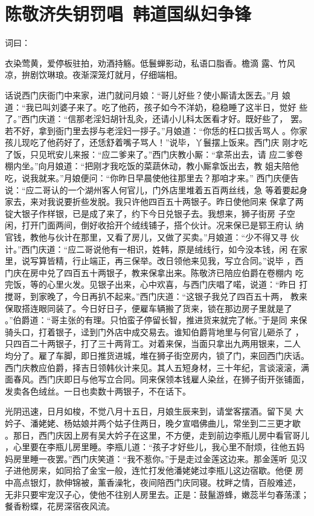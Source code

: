 \chapter{陈敬济失钥罚唱~韩道国纵妇争锋}

词曰：

衣染莺黄，爱停板驻拍，劝酒持觞。低鬟蝉影动，私语口脂香。檐滴
露、竹风凉，拚剧饮琳琅。夜渐深笼灯就月，仔细端相。

话说西门庆衙门中来家，进门就问月娘：“哥儿好些？使小厮请太医去。”月
娘道：“我已叫刘婆子来了。吃了他药，孩子如今不洋奶，稳稳睡了这半日，觉好
些了。”西门庆道：“信那老淫妇胡针乱灸，还请小儿科太医看才好。既好些了，
罢。若不好，拿到衙门里去拶与老淫妇一拶子。”月娘道：“你恁的枉口拔舌骂人
。你家孩儿现吃了他药好了，还恁舒着嘴子骂人！”说毕，丫鬟摆上饭来。西门庆
刚才吃了饭，只见玳安儿来报：“应二爹来了。”西门庆教小厮：“拿茶出去，请
应二爹卷棚内坐。”向月娘道：“把刚才我吃饭的菜蔬休动，教小厮拿饭出去，教
姐夫陪他吃，说我就来。”月娘便问：“你昨日早晨使他往那里去？那咱才来。”
西门庆便告说：“应二哥认的一个湖州客人何官儿，门外店里堆着五百两丝线，急
等着要起身家去，来对我说要折些发脱。我只许他四百五十两银子。昨日使他同来
保拿了两锭大银子作样银，已是成了来了，约下今日兑银子去。我想来，狮子街房
子空闲，打开门面两间，倒好收拾开个绒线铺子，搭个伙计。况来保已是郓王府认
纳官钱，教他与伙计在那里，又看了房儿，又做了买卖。”月娘道：“少不得又寻
伙计。”西门庆道：“应二哥说他有一相识，姓韩，原是绒线行，如今没本钱，闲
在家里，说写算皆精，行止端正，再三保举。改日领他来见我，写立合同。”说毕
，西门庆在房中兑了四百五十两银子，教来保拿出来。陈敬济已陪应伯爵在卷棚内
吃完饭，等的心里火发。见银子出来，心中欢喜，与西门庆唱了喏，说道：“昨日
打搅哥，到家晚了，今日再扒不起来。”西门庆道：“这银子我兑了四百五十两，
教来保取搭连眼同装了。今日好日子，便雇车辆搬了货来，锁在那边房子里就是了
。”伯爵道：“哥主张的有理。只怕蛮子停留长智，推进货来就完了帐。”于是同
来保骑头口，打着银子，迳到门外店中成交易去。谁知伯爵背地里与何官儿砸杀了
，只四百二十两银子，打了三十两背工。对着来保，当面只拿出九两用银来，二人
均分了。雇了车脚，即日推货进城，堆在狮子街空房内，锁了门，来回西门庆话。
西门庆教应伯爵，择吉日领韩伙计来见。其人五短身材，三十年纪，言谈滚滚，满
面春风。西门庆即日与他写立合同。同来保领本钱雇人染丝，在狮子街开张铺面，
发卖各色绒丝。一日也卖数十两银子，不在话下。

光阴迅速，日月如梭，不觉八月十五日，月娘生辰来到，请堂客摆酒。留下吴
大妗子、潘姥姥、杨姑娘并两个姑子住两日，晚夕宣唱佛曲儿，常坐到二三更才歇
。那日，西门庆因上房有吴大妗子在这里，不方便，走到前边李瓶儿房中看官哥儿
，心里要在李瓶儿房里睡。李瓶儿道：“孩子才好些儿，我心里不耐烦，往他五妈
妈房里睡一夜罢。”西门庆笑道：“我不惹你。”于是走过金莲这边来。那金莲听
见汉子进他房来，如同拾了金宝一般，连忙打发他潘姥姥过李瓶儿这边宿歇。他便
房中高点银灯，款伸锦被，薰香澡牝，夜间陪西门庆同寝。枕畔之情，百般难述，
无非只要牢宠汉子心，使他不往别人房里去。正是：鼓鬣游蜂，嫩蕊半匀春荡漾；
餐香粉蝶，花房深宿夜风流。

